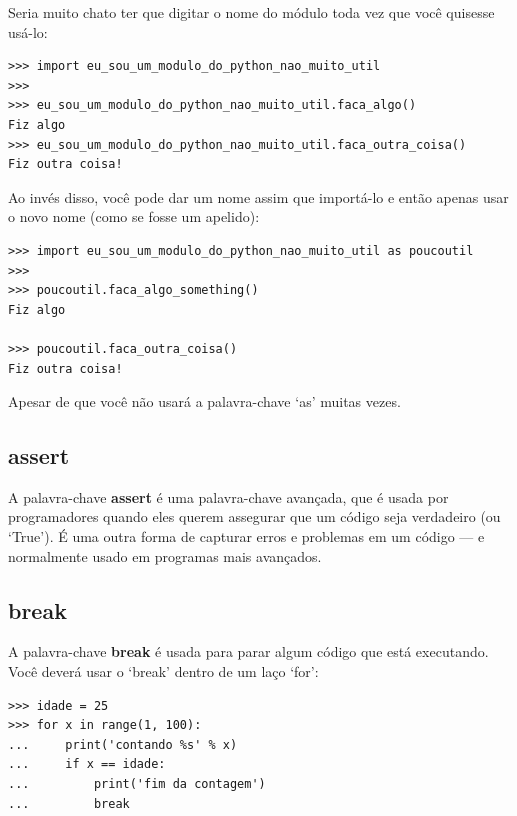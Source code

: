 \noindent
Seria muito chato ter que digitar o nome do módulo toda vez que você quisesse usá-lo:

\begin{listingignore}
\begin{verbatim}
>>> import eu_sou_um_modulo_do_python_nao_muito_util
>>>
>>> eu_sou_um_modulo_do_python_nao_muito_util.faca_algo()
Fiz algo
>>> eu_sou_um_modulo_do_python_nao_muito_util.faca_outra_coisa()
Fiz outra coisa!
\end{verbatim}
\end{listingignore}

\noindent
Ao invés disso, você pode dar um nome assim que importá-lo e então apenas usar o novo nome (como se fosse um apelido):

\begin{listingignore}
\begin{verbatim}
>>> import eu_sou_um_modulo_do_python_nao_muito_util as poucoutil
>>>
>>> poucoutil.faca_algo_something()
Fiz algo

>>> poucoutil.faca_outra_coisa()
Fiz outra coisa!
\end{verbatim}
\end{listingignore}

\noindent
Apesar de que você não usará a palavra-chave `as' muitas vezes.

\subsection*{assert}

A palavra-chave \textbf{assert} é uma palavra-chave avançada, que é usada por programadores quando eles querem assegurar que um código seja verdadeiro (ou `True'). É uma outra forma de capturar erros e problemas em um código --- e normalmente usado em programas mais avançados.

\subsection*{break}

A palavra-chave \textbf{break} é usada para parar algum código que está executando. Você deverá usar o `break' dentro de um laço `for':

\begin{listing}
\begin{verbatim}
>>> idade = 25
>>> for x in range(1, 100):
...     print('contando %s' % x)
...     if x == idade:
...         print('fim da contagem')
...         break
\end{verbatim}
\end{listing}

